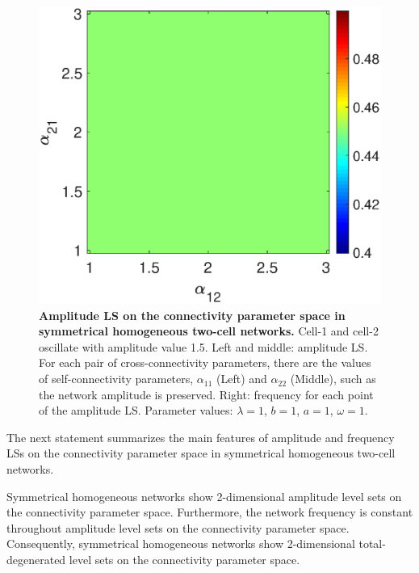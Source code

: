 \begin{figure}[h]
\begin{minipage}{0.32\linewidth}
\begin{center}
            \end{center}
        \end{minipage} 
    \begin{minipage}{0.32\linewidth}
        \begin{center}
            \includegraphics[width=1\linewidth]{Images/photo17_3.eps}
        \end{center}
    \end{minipage} 
  
  \caption{\textbf{Amplitude LS on the connectivity parameter space in symmetrical homogeneous two-cell networks.} Cell-1 and cell-2 oscillate with amplitude value 1.5. Left and middle: amplitude LS. For each pair of cross-connectivity parameters, there are the values of self-connectivity parameters, $\alpha_{11}$ (Left) and $\alpha_{22}$ (Middle), such as the network amplitude is preserved. Right: frequency for each point of the amplitude LS. Parameter values: $\lambda = 1$, $b=1$, $a = 1$, $\omega= 1$.}
  \label{photo17}
\end{figure}

The next statement summarizes the main features of amplitude and frequency LSs on the connectivity parameter space in symmetrical homogeneous two-cell networks.

\begin{Statement}
Symmetrical homogeneous networks show 2-dimensional amplitude level sets on the connectivity parameter space. Furthermore, the network frequency is constant throughout amplitude level sets on the connectivity parameter space. Consequently, symmetrical homogeneous networks show 2-dimensional total-degenerated level sets on the connectivity parameter space.
\end{Statement}

